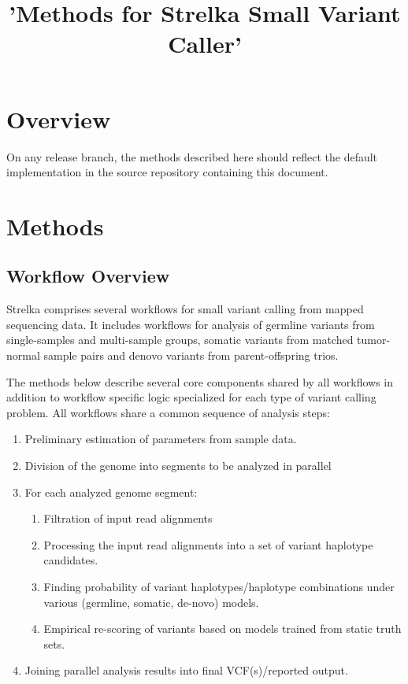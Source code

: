 \documentclass{article}
\title{'Methods for Strelka Small Variant Caller'}
\begin{document}
\maketitle

\tableofcontents

\section{Overview}

On any release branch, the methods described here should reflect the default implementation in the source
repository containing this document.

\section{Methods}

\subsection{Workflow Overview}

Strelka comprises several workflows for small variant calling from mapped sequencing data. It includes workflows for analysis of germline variants from single-samples and multi-sample groups, somatic variants from matched tumor-normal sample pairs and denovo variants from parent-offspring trios.

The methods below describe several core components shared by all workflows in addition to workflow specific logic specialized for each type of variant calling problem. All workflows share a common sequence of analysis steps:

\begin{enumerate}
\item Preliminary estimation of parameters from sample data.
\item Division of the genome into segments to be analyzed in parallel
\item For each analyzed genome segment:
\begin{enumerate}
\item Filtration of input read alignments
\item Processing the input read alignments into a set of variant haplotype candidates.
\item Finding probability of variant haplotypes/haplotype combinations under various (germline, somatic, de-novo) models.
\item Empirical re-scoring of variants based on models trained from static truth sets.
\end{enumerate}
\item Joining parallel analysis results into final VCF(s)/reported output.
\end{enumerate}
\end{document}
